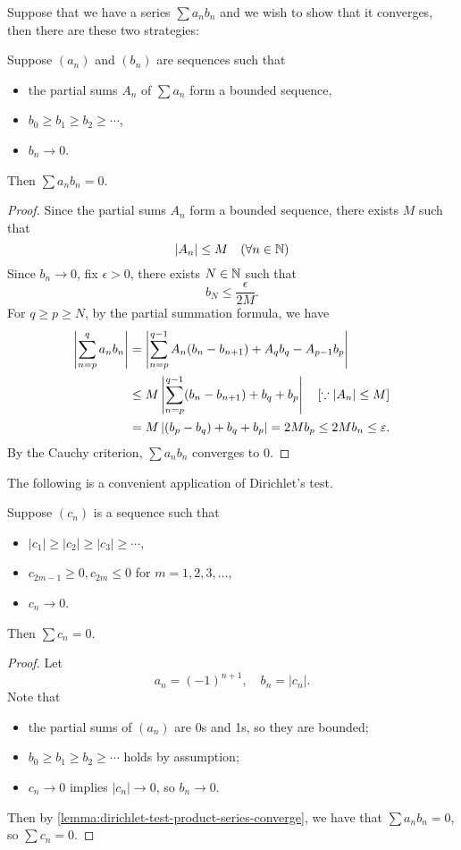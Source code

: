 Suppose that we have a series $\sum a_n b_n$ and we wish to show that it converges, then there are these two strategies:

\begin{lemma}\label{lemma:dirichlet-test-product-series-converge}
Suppose $(a_n)$ and $(b_n)$ are sequences such that
\begin{itemize}
\item the partial sums $A_n$ of $\sum a_n$ form a bounded sequence,
\item $b_0\ge b_1\ge b_2\ge\cdots$,
\item $b_n\to0$.
\end{itemize}
Then $\sum a_nb_n=0$.
\end{lemma}

\begin{proof}
Since the partial sums $A_n$ form a bounded sequence, there exists $M$ such that
\[|A_n|\le M\quad(\forall n\in\mathbb N)\]
Since $b_n\to0$, fix $\epsilon>0$, there exists $N\in\mathbb N$ such that
\[b_N\le\frac{\epsilon}{2M}.\]
For $q\ge p\ge N$, by the partial summation formula, we have
\begin{align*}
\left|\sum_{n=p}^{q}a_nb_n\right|
&=\left|\sum_{n=p}^{q-1}A_n(b_n-b_{n+1})+A_qb_q-A_{p-1}b_p\right|\\
&\le M\left|\sum_{n=p}^{q-1}(b_n-b_{n+1})+b_q+b_p\right|\quad[\because |A_n|\le M]\\
&=M\left|(b_p-b_q)+b_q+b_p\right|=2Mb_p\le 2Mb_n\le\varepsilon.
\end{align*}
By the Cauchy criterion, $\sum a_nb_n$ converges to $0$.
\end{proof}

The following is a convenient application of Dirichlet's test.

\begin{corollary}
Suppose $(c_n)$ is a sequence such that
\begin{itemize}
\item $|c_1|\ge|c_2|\ge|c_3|\ge\cdots$,
\item $c_{2m-1}\ge0,c_{2m}\le0$ for $m=1,2,3,\dots$,
\item $c_n\to0$.
\end{itemize}
Then $\sum c_n=0$.
\end{corollary}

\begin{proof}
Let
\[a_n=(-1)^{n+1},\quad b_n=|c_n|.\]
Note that
\begin{itemize}
\item the partial sums of $(a_n)$ are 0s and 1s, so they are bounded;
\item $b_0\ge b_1\ge b_2\ge\cdots$ holds by assumption;
\item $c_n\to0$ implies $|c_n|\to0$, so $b_n\to0$.
\end{itemize}
Then by \ref{lemma:dirichlet-test-product-series-converge}, we have that $\sum a_nb_n=0$, so $\sum c_n=0$.
\end{proof}

